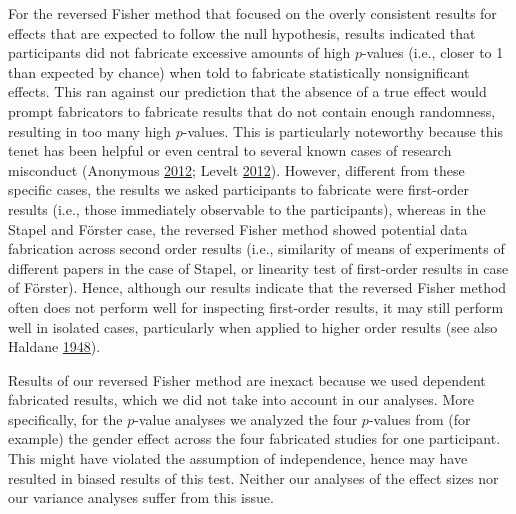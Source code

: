 \documentclass[a5paper]{book}
\begin{document}
For the reversed Fisher method that focused on the overly consistent
results for effects that are expected to follow the null hypothesis,
results indicated that participants did not fabricate excessive amounts
of high \(p\)-values (i.e., closer to 1 than expected by chance) when
told to fabricate statistically nonsignificant effects. This ran against
our prediction that the absence of a true effect would prompt
fabricators to fabricate results that do not contain enough randomness,
resulting in too many high \(p\)-values. This is particularly noteworthy
because this tenet has been helpful or even central to several known
cases of research misconduct (Anonymous
\protect\hyperlink{ref-foerster-complaint}{2012}; Levelt
\protect\hyperlink{ref-Levelt2012}{2012}). However, different from these
specific cases, the results we asked participants to fabricate were
first-order results (i.e., those immediately observable to the
participants), whereas in the Stapel and Förster case, the reversed
Fisher method showed potential data fabrication across second order
results (i.e., similarity of means of experiments of different papers in
the case of Stapel, or linearity test of first-order results in case of
Förster). Hence, although our results indicate that the reversed Fisher
method often does not perform well for inspecting first-order results,
it may still perform well in isolated cases, particularly when applied
to higher order results (see also Haldane
\protect\hyperlink{ref-Haldane1948-nm}{1948}).

Results of our reversed Fisher method are inexact because we used
dependent fabricated results, which we did not take into account in our
analyses. More specifically, for the \(p\)-value analyses we analyzed
the four \(p\)-values from (for example) the gender effect across the
four fabricated studies for one participant. This might have violated
the assumption of independence, hence may have resulted in biased
results of this test. Neither our analyses of the effect sizes nor our
variance analyses suffer from this issue.
\end{document}
